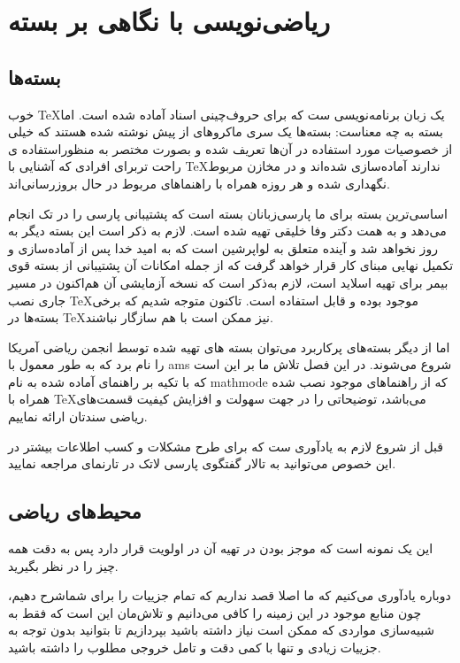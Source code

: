 \chapter[ریاضی‌نویسی با نگاهی بر بسته AMS]{ریاضی‌نویسی با نگاهی بر بسته }
\section{بسته‌ها}
خوب \TeX یک زبان برنامه‌نویسی ست که برای حروف‌چینی اسناد آماده شده است. اما بسته به چه معناست: بسته‌ها یک سری ماکروهای از پیش نوشته شده هستند که خیلی از خصوصیات مورد استفاده در آن‌ها تعریف شده و بصورت
 مختصر به منظوراستفاده ی راحت تربرای افرادی که آشنایی با \TeX ندارند آماده‌سازی شده‌اند و در مخازن مربوط نگهداری شده و هر روزه همراه با راهنماهای مربوط در حال بروزرسانی‌اند.

اساسی‌ترین بسته برای ما پارسی‌زبانان بسته
\XePersian
است که پشتیبانی پارسی را در تک انجام می‌دهد و به همت دکتر وفا خلیقی تهیه شده است. لازم به ذکر است این بسته دیگر به روز نخواهد شد و آینده متعلق به لواپرشین است که به امید خدا پس از آماده‌سازی و تکمیل نهایی مبنای کار قرار خواهد گرفت که از جمله امکانات آن پشتیبانی از بسته قوی بیمر برای تهیه اسلاید است، لازم به‌ذکر است که نسخه آزمایشی آن هم‌اکنون در مسیر جاری نصب \TeX موجود بوده و قابل استفاده است. تاکنون متوجه شدیم که برخی بسته‌ها در \TeX نیز ممکن است با هم سازگار نباشند.

اما از دیگر بسته‌های پرکاربرد می‌توان بسته های تهیه شده توسط انجمن ریاضی آمریکا را نام برد که به طور معمول با ams شروع می‌شوند. در این فصل تلاش ما بر این است که با تکیه بر راهنمای آماده شده به نام mathmode که از راهنماهای موجود نصب شده همراه با \TeX می‌باشد، توضیحاتی را در جهت سهولت و افزایش کیفیت قسمت‌های ریاضی سندتان ارائه نماییم.

قبل از شروع لازم به یادآوری‌ ست که برای طرح مشکلات و کسب اطلاعات بیشتر در این خصوص می‌توانید به تالار گفتگوی پارسی لاتک در تارنمای   مراجعه نمایید.

\section{محیط‌های ریاضی}
این یک نمونه است که موجز بودن در تهیه آن در اولویت قرار دارد پس به دقت همه چیز را در نظر بگیرید.

دوباره یادآوری می‌کنیم که ما اصلا قصد نداریم که تمام جزییات را برای‌ شماشرح دهیم، چون منابع موجود در این زمینه را کافی می‌دانیم و تلاش‌مان این است که فقط به شبیه‌سازی مواردی که ممکن است نیاز داشته باشید بپردازیم تا بتوانید بدون توجه به جزییات زیادی و تنها با کمی دقت و تامل خروجی مطلوب را داشته باشید.

